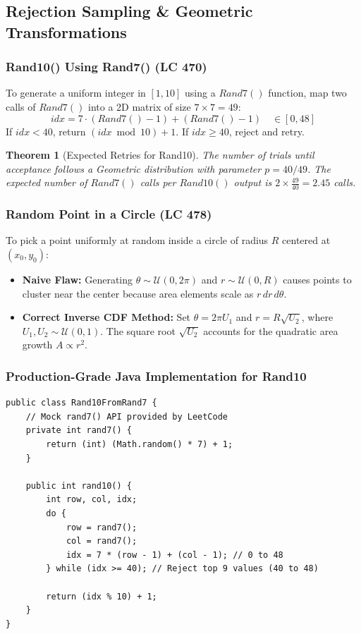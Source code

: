 \documentclass[10pt,journal,compsoc,onecolumn]{IEEEtran}
\newtheorem{theorem}{Theorem}
\begin{document}
\subsection{Rejection Sampling \& Geometric Transformations}

\subsubsection{Rand10() Using Rand7() (LC 470)}
To generate a uniform integer in $[1, 10]$ using a $Rand7()$ function, map two calls of $Rand7()$ into a 2D matrix of size $7 \times 7 = 49$:
\[
idx = 7 \cdot (Rand7() - 1) + (Rand7() - 1) \quad \in [0, 48]
\]
If $idx < 40$, return $(idx \bmod 10) + 1$. If $idx \ge 40$, reject and retry.

\begin{theorem}[Expected Retries for Rand10]
The number of trials until acceptance follows a Geometric distribution with parameter $p = 40/49$. The expected number of $Rand7()$ calls per $Rand10()$ output is $2 \times \frac{49}{40} = 2.45$ calls.
\end{theorem}

\subsubsection{Random Point in a Circle (LC 478)}
To pick a point uniformly at random inside a circle of radius $R$ centered at $(x_0, y_0)$:
\begin{itemize}
    \item \textbf{Naive Flaw:} Generating $\theta \sim \mathcal{U}(0, 2\pi)$ and $r \sim \mathcal{U}(0, R)$ causes points to cluster near the center because area elements scale as $r \, dr \, d\theta$.
    \item \textbf{Correct Inverse CDF Method:} Set $\theta = 2\pi U_1$ and $r = R \sqrt{U_2}$, where $U_1, U_2 \sim \mathcal{U}(0,1)$. The square root $\sqrt{U_2}$ accounts for the quadratic area growth $A \propto r^2$.
\end{itemize}

\subsubsection{Production-Grade Java Implementation for Rand10}

\begin{verbatim}
public class Rand10FromRand7 {
    // Mock rand7() API provided by LeetCode
    private int rand7() {
        return (int) (Math.random() * 7) + 1;
    }

    public int rand10() {
        int row, col, idx;
        do {
            row = rand7();
            col = rand7();
            idx = 7 * (row - 1) + (col - 1); // 0 to 48
        } while (idx >= 40); // Reject top 9 values (40 to 48)

        return (idx % 10) + 1;
    }
}
\end{verbatim}
\end{document}
